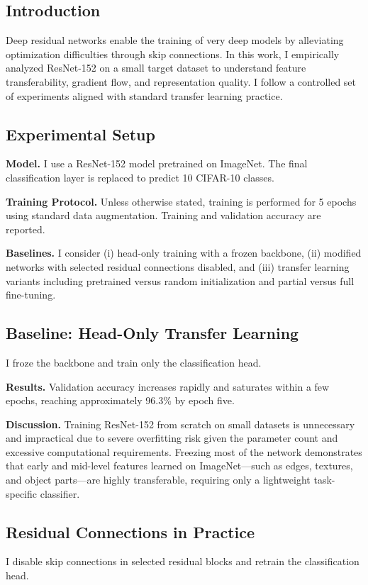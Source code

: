 \documentclass{article}
\begin{document}
\subsection{Introduction}
Deep residual networks enable the training of very deep models by alleviating optimization difficulties through skip connections. In this work, I empirically analyzed ResNet-152 on a small target dataset to understand feature transferability, gradient flow, and representation quality. I follow a controlled set of experiments aligned with standard transfer learning practice.

\subsection{Experimental Setup}
\textbf{Model.} I use a ResNet-152 model pretrained on ImageNet. The final classification layer is replaced to predict 10 CIFAR-10 classes.

\textbf{Training Protocol.} Unless otherwise stated, training is performed for 5 epochs using standard data augmentation. Training and validation accuracy are reported.

\textbf{Baselines.} I consider (i) head-only training with a frozen backbone, (ii) modified networks with selected residual connections disabled, and (iii) transfer learning variants including pretrained versus random initialization and partial versus full fine-tuning.
\subsection{Baseline: Head-Only Transfer Learning}
I froze the backbone and train only the classification head.

\textbf{Results.} Validation accuracy increases rapidly and saturates within a few epochs, reaching approximately 96.3\% by epoch five.

\textbf{Discussion.} Training ResNet-152 from scratch on small datasets is unnecessary and impractical due to severe overfitting risk given the parameter count and excessive computational requirements. Freezing most of the network demonstrates that early and mid-level features learned on ImageNet—such as edges, textures, and object parts—are highly transferable, requiring only a lightweight task-specific classifier.

\subsection{Residual Connections in Practice}
I disable skip connections in selected residual blocks and retrain the classification head.
\end{document}
